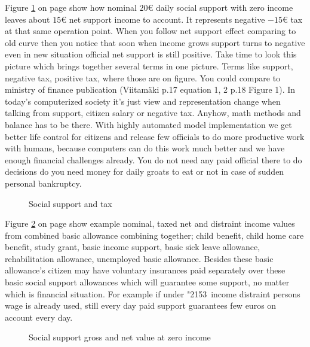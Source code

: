 Figure \ref{fig:SocTax} on page \pageref{fig:SocTax} show how nominal
$20\euro$ daily social support with zero income leaves about $15\euro$ net
support income to account. It represents negative $-15\euro$ tax at that same
operation point. When you follow net support effect comparing to old curve
then you notice that soon when income grows support turns to negative even
in new situation official net support is still positive. Take time to look
this picture which brings together several terms in one picture. Terms like
support, negative tax, positive tax, where those are on figure. You could
compare to ministry of finance publication (Viitam\"aki\allowbreak\cite{
 VM_46_2019} p.17 equation 1, 2 p.18 Figure 1). In today's computerized
society it's just view and representation change when talking from support,
citizen salary or negative tax. Anyhow, math methods and balance has to be
there. With highly automated model implementation we get better life control
for citizens and release few officials to do more productive work with humans,
because computers can do this work much better and we have enough financial
challenges already. You do not need any paid official there to do decisions
do you need money for daily groats to eat or not in case of sudden personal
bankruptcy.
\begin{figure} %
 \begin{center}
  \caption{Social support and tax}
  \label{fig:SocTax}  
 \end{center}
\end{figure}

Figure \ref{fig:SocialSu} on page \pageref{fig:SocialSu} show example nominal,
taxed net and distraint income values from combined basic allowance combining
together; child benefit, child home care benefit, study grant, basic income
support, basic sick leave allowance, rehabilitation allowance, unemployed
basic allowance. Besides these basic allowance's citizen may have voluntary
insurances paid separately over these basic social support allowances which
will guarantee some support, no matter which is financial situation. For
example if under \char"2153~income distraint persons wage is already used,
still every day paid support guarantees few euros on account every day.

\begin{figure} %
 \begin{center}
  \caption{Social support gross and net value at zero income}
  \label{fig:SocialSu} 
 \end{center}
\end{figure}

